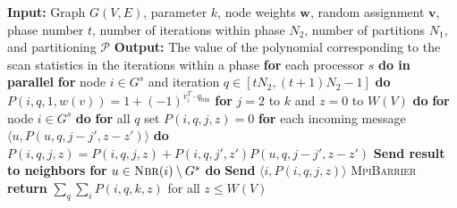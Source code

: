 
\begin{algorithm}{}
\small
\caption{}
\label{alg:parEvaluateScanStat} 
\begin{algorithmic}[1]
\STATE \textbf{Input:} Graph $G(V, E)$, parameter $k$, node weights $\mathbf{w}$, 
random assignment $\mathbf{v}$, phase number $t$, number of iterations within phase $N_2$,
number of partitions $N_1$, and partitioning $\mathcal{P}$
\STATE \textbf{Output:} The value of the polynomial corresponding to the scan statistics in the iterations within a phase
\STATE
\STATE \textbf{for} each processor $s$ \textbf{do in parallel}
\STATE \quad \textbf{for} node $i \in G^s$ and iteration $q \in [tN_2,(t+1)N_2-1]$ \textbf{do}
\STATE \qquad $ P(i, q, 1, w(v)) = 1 + (-1)^{v_i^T \cdot q_{\text{bin}}}$
\STATE \quad \textbf{for} $j=2$ to $k$ and $z=0$ to $W(V)$ \textbf{do}
\STATE \qquad \textbf{for} node $i \in G^s$ \textbf{do}
\STATE \qquad \quad \textbf{for} all $q$ set $P(i,q, j, z) = 0$
\STATE \qquad \quad \textbf{for} each incoming message $\langle u, P(u, q, j-j', z-z')\rangle$ \textbf{do}
\STATE \qquad \qquad $P(i, q, j, z)= P(i, q, j, z) + P(i, q, j', z')  P(u, q, j-j', z-z')$
\STATE \qquad \quad  \textbf{Send result to neighbors}
\STATE \qquad \quad \textbf{for} $u \in \textsc{Nbr}(i)\setminus G^s$ \textbf{do}
\STATE \qquad \qquad \textbf{Send} $\langle i, P(i, q, j, z)\rangle$
\STATE \textsc{MpiBarrier}
\STATE \textbf{return} $\sum_q \sum_i P(i, q, k, z)$ for all $z \leq W(V)$
\end{algorithmic}
\end{algorithm}